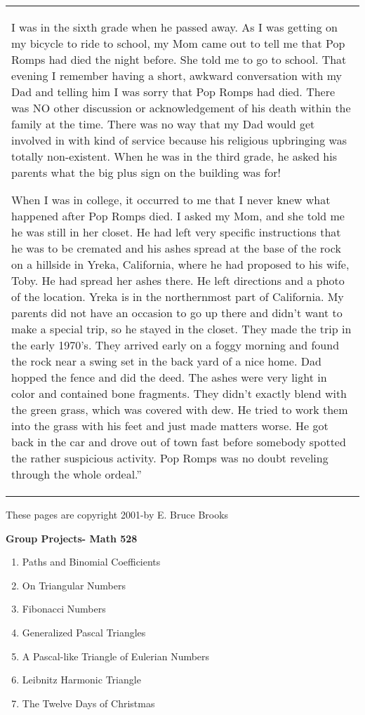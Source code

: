 \documentclass[10pt,letter]{article}
\renewenvironment{quote}
  {\begin{tabular}{|p{13cm}}}
  {\end{tabular}}
\begin{document}
\begin{quote}
I was in the sixth grade when he passed away. As I was getting on my
bicycle to ride to school, my Mom came out to tell me that Pop Romps had
died the night before. She told me to go to school. That evening I
remember having a short, awkward conversation with my Dad and telling
him I was sorry that Pop Romps had died. There was NO other discussion
or acknowledgement of his death within the family at the time. There was
no way that my Dad would get involved in with kind of service because
his religious upbringing was totally non-existent. When he was in the
third grade, he asked his parents what the big plus sign on the building
was for!

When I was in college, it occurred to me that I never knew what happened
after Pop Romps died. I asked my Mom, and she told me he was still in
her closet. He had left very specific instructions that he was to be
cremated and his ashes spread at the base of the rock on a hillside in
Yreka, California, where he had proposed to his wife, Toby. He had
spread her ashes there. He left directions and a photo of the location.
Yreka is in the northernmost part of California. My parents did not have
an occasion to go up there and didn't want to make a special trip, so he
stayed in the closet. They made the trip in the early 1970's. They
arrived early on a foggy morning and found the rock near a swing set in
the back yard of a nice home. Dad hopped the fence and did the deed. The
ashes were very light in color and contained bone fragments. They didn't
exactly blend with the green grass, which was covered with dew. He tried
to work them into the grass with his feet and just made matters worse.
He got back in the car and drove out of town fast before somebody
spotted the rather suspicious activity. Pop Romps was no doubt reveling
through the whole ordeal.''

\end{quote}

These pages are copyright 2001-by E. Bruce Brooks

\textbf{Group Projects- Math 528}
\begin{enumerate}
\def\labelenumi{\arabic{enumi}.}

\item
  Paths and Binomial Coefficients
\item
  On Triangular Numbers
\item
  Fibonacci Numbers
\item
  Generalized Pascal Triangles
\item
  A Pascal-like Triangle of Eulerian Numbers
\item
  Leibnitz Harmonic Triangle
\item
  The Twelve Days of Christmas

\end{enumerate}
\end{document}
